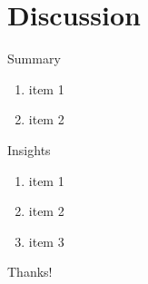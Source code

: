 \documentclass{beamer}
\begin{document}
\section{Discussion}

\begin{frame}
    \begin{block}{Summary}
        \begin{enumerate}
            \item item 1
            \item item 2
        \end{enumerate}
    \end{block}
    \begin{alertblock}{Insights}
        \begin{enumerate}
            \item item 1
            \item item 2
            \item item 3
        \end{enumerate}
    \end{alertblock}
\end{frame}

\begin{frame}
    \begin{center}
        {\Huge\calligra Thanks!}
    \end{center}
\end{frame}
\end{document}
